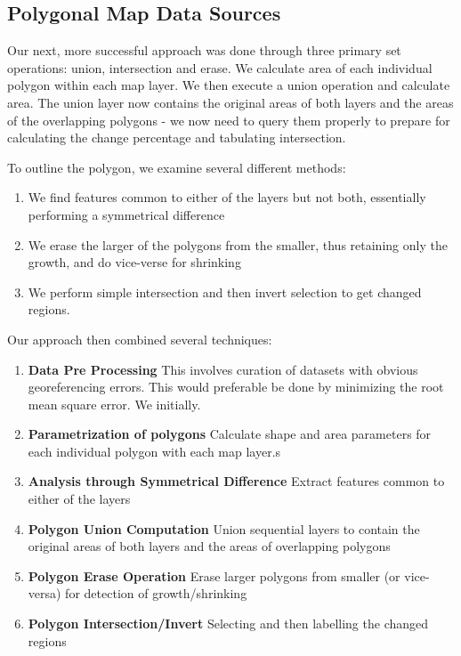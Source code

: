 \documentclass[conference]{IEEEtran}
\begin{document}
\subsection{Polygonal Map Data Sources}


Our next, more successful approach was done through three primary set operations: union, intersection and erase. We calculate area of each individual polygon within each map layer. We then execute a union operation and calculate area. The union layer now contains the original areas of both layers and the areas of the overlapping polygons - we now need to query them properly to prepare for calculating the change percentage and tabulating intersection.

To outline the polygon, we examine several different methods:
\begin{enumerate}
	\item We find features common to either of the layers but not both, essentially performing a symmetrical difference
	\item We erase the larger of the polygons from the smaller, thus retaining only the growth, and do vice-verse for shrinking
	\item We perform simple intersection and then invert selection to get changed regions. 
\end{enumerate}

Our approach then combined several techniques:
\begin{enumerate}
	\item \textbf{Data Pre Processing} This involves curation of datasets with obvious georeferencing errors. This would preferable be done by minimizing the root mean square error. We initially.
	\item \textbf{Parametrization of polygons} Calculate shape and area parameters for each individual polygon with each map layer.s
	\item \textbf{Analysis through Symmetrical Difference} Extract features common to either of the layers
	\item \textbf{Polygon Union Computation} Union sequential layers to contain the original areas of both layers and the areas of overlapping polygons
	\item \textbf{Polygon Erase Operation} Erase larger polygons from smaller (or vice-versa) for detection of growth/shrinking
	\item \textbf{Polygon Intersection/Invert} Selecting and then labelling the changed regions
\end{enumerate}
\end{document}
